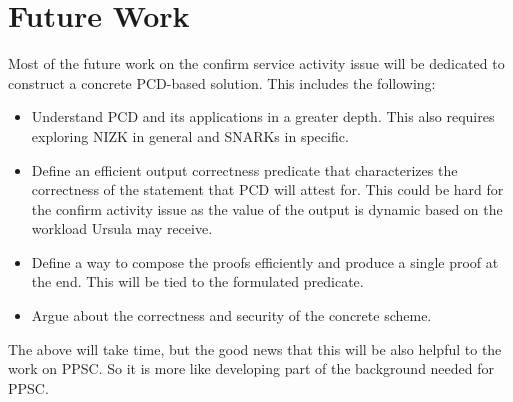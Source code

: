 \section{Future Work}
\label{future-work}
Most of the future work on the confirm service activity issue 
will be dedicated to construct a concrete PCD-based solution. This 
includes the following:
\begin{itemize}
\item Understand PCD and its applications in a greater depth. This 
also requires exploring NIZK in general and SNARKs in specific. 

\item Define an efficient output correctness predicate that characterizes 
the correctness of the statement that PCD will attest for. This could be 
hard for the confirm activity issue as the value of the output is dynamic 
based on the workload Ursula may receive.

\item Define a way to compose the proofs efficiently and produce 
a single proof at the end. This will be tied to the formulated predicate.

\item Argue about the correctness and security of the concrete scheme.
\end{itemize} 


The above will take time, but the good news that this will be also helpful 
to the work on PPSC. So it is more like developing part of the  
background needed for PPSC.
